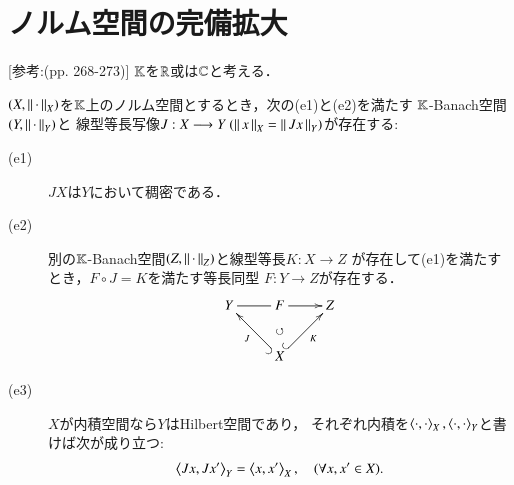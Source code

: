\section{ノルム空間の完備拡大}
	[参考:\cite{key6}(pp. 268-273)] $\mathbb{K}$を$\mathbb{R}$或は$\mathbb{C}$と考える．
	\begin{screen}
		\begin{thm}[ノルム空間の完備化]\label{thm:expansion_of_normed_space}
			$(X,\left\|\, \cdot\, \right\|_{X})$を$\mathbb{K}$上のノルム空間とするとき，次の(e1)と(e2)を満たす
			$\mathbb{K}$-Banach空間$(Y,\left\|\, \cdot\, \right\|_{Y})$と
			線型等長写像$J:X \longrightarrow Y\ (\left\|\, x\, \right\|_{X} = \left\|\, J x\, \right\|_{Y})$が存在する:
			\begin{description}
				\item[(e1)] $JX$は$Y$において稠密である．
				\item[(e2)] 別の$\mathbb{K}$-Banach空間$(Z,\left\|\, \cdot\, \right\|_{Z})$と線型等長$K:X \longrightarrow Z$
					が存在して(e1)を満たすとき，$F \circ J = K$を満たす等長同型
					$F:Y \longrightarrow Z$が存在する．
					\begin{align}
						\xymatrix{
							Y \ar@{-}[r] & F \ar[r] & Z \\
							& X \ar@{^{(}->}[lu]^-J \ar@{}[u]|\circlearrowleft \ar@{^{(}->}[ru]_-K & 
						}
					\end{align}
				\item[(e3)] $X$が内積空間なら$Y$はHilbert空間であり，
					それぞれ内積を$\inprod<\cdot,\cdot>_X,\inprod<\cdot,\cdot>_Y$と書けば次が成り立つ:
					\begin{align}
						\inprod<J x, J x'>_Y = \inprod<x,x'>_X,
						\quad (\forall x,x' \in X).
					\end{align}
			\end{description}
		\end{thm}
	\end{screen}
	
